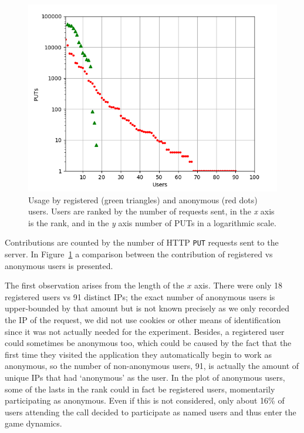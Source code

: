 \documentclass{llncs}
\begin{document}
\begin{figure}[h!tb]
    \centering
        \includegraphics[width=0.9\linewidth]{img/puts.png}
        
    \caption{Usage by registered (green triangles) and anonymous (red dots) users.  Users are ranked by
        the number of requests sent, in the \emph{x} axis is the rank, and in the \emph{y} axis
        number of PUTs in a logarithmic scale.}
      \label{fig:puts}
\end{figure}
%
Contributions are counted by the number of HTTP {\tt PUT} requests
sent to the server. In Figure~\ref{fig:puts} a comparison between the 
contribution of registered vs anonymous users is presented.

The first observation arises from the length of the $x$ axis. There
were only 18 registered users vs 91 distinct IPs; the 
exact number of anonymous users is upper-bounded by that amount but is
not known precisely as we only recorded the IP of the request, we did
not use cookies or other means of identification since it was not
actually needed for the experiment. Besides, a registered user
could sometimes be anonymous too, which could be caused by the fact that the first time they visited
the application they automatically begin to work as anonymous, so the
number of non-anonymous users, 91, is actually the amount of unique
IPs that had `anonymous' as the user. In the plot of 
anonymous users, some of the lasts in the rank could in fact be registered users,
momentarily participating as anonymous. Even if this is not considered, only
about 16\% of users attending the call decided to participate as named
users and thus enter the game dynamics. 
\end{document}
